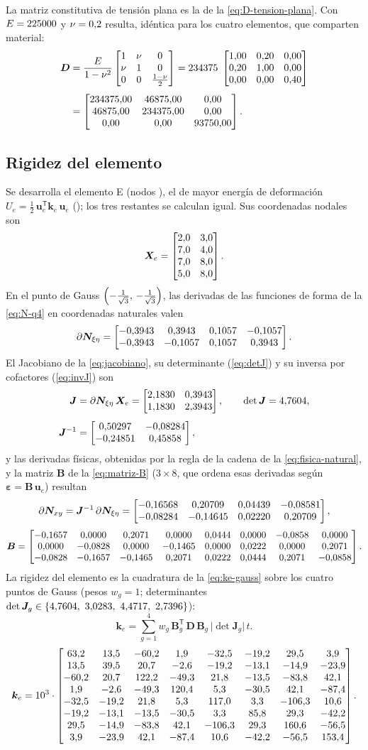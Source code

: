 La matriz constitutiva de tensión plana es la de la \autoref{eq:D-tension-plana}. Con $E=\valE$ y $\nu=\valNu$ resulta, idéntica para los cuatro elementos, que comparten material:
\begin{align*}
\bm{D}&=\frac{E}{1-\nu^{2}}
\begin{bmatrix} 1 & \nu & 0 \\ \nu & 1 & 0 \\ 0 & 0 & \tfrac{1-\nu}{2} \end{bmatrix}
=\valDfactor\;\DmatNorm \\[0.4em]
&=\Dmat .
\end{align*}

\subsection{Rigidez del elemento}

Se desarrolla el elemento E\showId{} (nodos \showNodes), el de mayor energía de deformación $U_e=\tfrac12\,\bm{u}_e^{\mathsf{T}}\bm{k}_e\,\bm{u}_e$ (\energiaInline); los tres restantes se calculan igual. Sus coordenadas nodales son
\[
\bm{X}_e=\Xemat .
\]
En el punto de Gauss $\gpA$, las derivadas de las funciones de forma de la \autoref{eq:N-q4} en coordenadas naturales valen
\[
\partial\bm{N}_{\xi\eta}=\dNnatA .
\]
El Jacobiano de la \autoref{eq:jacobiano}, su determinante (\autoref{eq:detJ}) y su inversa por cofactores (\autoref{eq:invJ}) son
\begin{align*}
\bm{J}&=\partial\bm{N}_{\xi\eta}\,\bm{X}_e=\Jmata, \qquad
\det\bm{J}=\detJa, \\[0.4em]
\bm{J}^{-1}&=\invJa,
\end{align*}
y las derivadas físicas, obtenidas por la regla de la cadena de la \autoref{eq:fisica-natural}, y la matriz $\bm{B}$ de la \autoref{eq:matriz-B} ($3\times 8$, que ordena esas derivadas según $\bm{\varepsilon}=\bm{B}\,\bm{u}_e$) resultan
\[
\partial\bm{N}_{xy}=\bm{J}^{-1}\,\partial\bm{N}_{\xi\eta}=\dNphysA ,
\]
{\footnotesize\setlength{\arraycolsep}{4pt}
\[
\bm{B}=\Bmata .
\]
}%
La rigidez del elemento es la cuadratura de la \autoref{eq:ke-gauss} sobre los cuatro puntos de Gauss (pesos $w_g=1$; determinantes $\det\bm{J}_g \in \{\detJinline\}$):
\[
\bm{k}_e=\sum_{g=1}^{4} w_g\,\bm{B}_g^{\mathsf{T}}\,\bm{D}\,\bm{B}_g\,\lvert\det\bm{J}_g\rvert\,t .
\]
{\footnotesize\setlength{\arraycolsep}{3.5pt}
\[
\bm{k}_e=\keScale\cdot\keMat .
\]
}%

